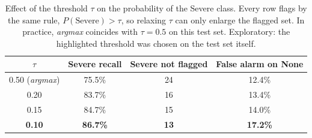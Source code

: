 \begin{table}[!t]
\centering
\caption{Effect of the threshold $\tau$ on the probability of the Severe class. Every row flags by the same rule, $P(\text{Severe}) > \tau$, so relaxing $\tau$ can only enlarge the flagged set. In practice, \emph{argmax} coincides with $\tau = 0.5$ on this test set. Exploratory: the highlighted threshold was chosen on the test set itself.}
\label{tab:limiar-teste}
\begin{tabular}{cccc}
\toprule
$\tau$ & Severe recall & Severe not flagged & False alarm on None \\
\midrule
0.50 (\emph{argmax}) & 75.5\% & 24 & 12.4\% \\
0.20 & 83.7\% & 16 & 13.4\% \\
0.15 & 84.7\% & 15 & 14.0\% \\
\textbf{0.10} & \textbf{86.7\%} & \textbf{13} & \textbf{17.2\%} \\
\bottomrule
\end{tabular}
\end{table}
